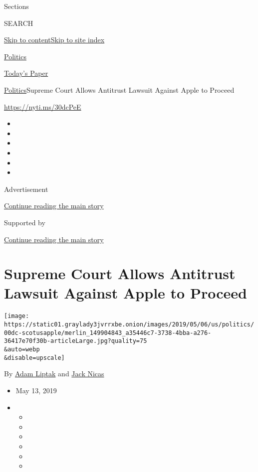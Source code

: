 Sections

SEARCH

\protect\hyperlink{site-content}{Skip to
content}\protect\hyperlink{site-index}{Skip to site index}

\href{https://www.nytimes3xbfgragh.onion/section/politics}{Politics}

\href{https://myaccount.nytimes3xbfgragh.onion/auth/login?response_type=cookie\&client_id=vi}{}

\href{https://www.nytimes3xbfgragh.onion/section/todayspaper}{Today's
Paper}

\href{/section/politics}{Politics}\textbar{}Supreme Court Allows
Antitrust Lawsuit Against Apple to Proceed

\href{https://nyti.ms/30dcPeE}{https://nyti.ms/30dcPeE}

\begin{itemize}
\item
\item
\item
\item
\item
\item
\end{itemize}

Advertisement

\protect\hyperlink{after-top}{Continue reading the main story}

Supported by

\protect\hyperlink{after-sponsor}{Continue reading the main story}

\hypertarget{supreme-court-allows-antitrust-lawsuit-against-apple-to-proceed}{%
\section{Supreme Court Allows Antitrust Lawsuit Against Apple to
Proceed}\label{supreme-court-allows-antitrust-lawsuit-against-apple-to-proceed}}

\texttt{[image: https://static01.graylady3jvrrxbe.onion/images/2019/05/06/us/politics/00dc-scotusapple/merlin\_149904843\_a35446c7-3738-4bba-a276-36417e70f30b-articleLarge.jpg?quality=75\\\&auto=webp\\\&disable=upscale]}

By \href{https://www.nytimes3xbfgragh.onion/by/adam-liptak}{Adam Liptak}
and \href{https://www.nytimes3xbfgragh.onion/by/jack-nicas}{Jack Nicas}

\begin{itemize}
\item
  May 13, 2019
\item
  \begin{itemize}
  \item
  \item
  \item
  \item
  \item
  \item
  \end{itemize}
\end{itemize}

